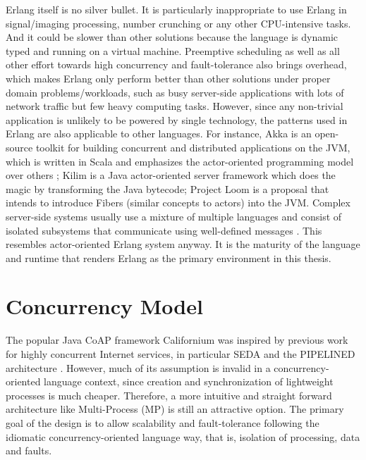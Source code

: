 Erlang itself is no silver bullet. It is particularly inappropriate to use Erlang in signal/imaging processing, number crunching or any other CPU-intensive tasks. And it could be slower than other solutions because the language is dynamic typed and running on a virtual machine. Preemptive scheduling as well as all other effort towards high concurrency and fault-tolerance also brings overhead, which makes Erlang only perform better than other solutions under proper domain problems/workloads, such as busy server-side applications with lots of network traffic but few heavy computing tasks. However, since any non-trivial application is unlikely to be powered by single technology, the patterns used in Erlang are also applicable to other languages. For instance, Akka \cite{akka} is an open-source toolkit for building concurrent and distributed applications on the JVM, which is written in Scala and emphasizes the actor-oriented programming model over others ; Kilim \cite{srinivasan2008kilim}\cite{UCAM-CL-TR-769} is a Java actor-oriented server framework which does the magic by transforming the Java bytecode; Project Loom \cite{java-loom} is a proposal that intends to introduce Fibers (similar concepts to actors) into the JVM. Complex server-side systems usually use a mixture of multiple languages and consist of isolated subsystems that communicate using well-defined messages \cite{UCAM-CL-TR-769}. This resembles actor-oriented Erlang system anyway. It is the maturity of the language and runtime that renders Erlang as the primary environment in this thesis.

\section{Concurrency Model}

The popular Java CoAP framework Californium was inspired by previous work for highly concurrent Internet services, in particular SEDA and the PIPELINED architecture \cite{lanter2013scalability}\cite{kovatsch2015scalable}. However, much of its assumption is invalid in a concurrency-oriented language context, since creation and synchronization of lightweight processes is much cheaper. Therefore, a more intuitive and straight forward architecture like Multi-Process (MP) is still an attractive option. The primary goal of the design is to allow scalability and fault-tolerance following the idiomatic concurrency-oriented language way, that is, isolation of processing, data and faults. 

